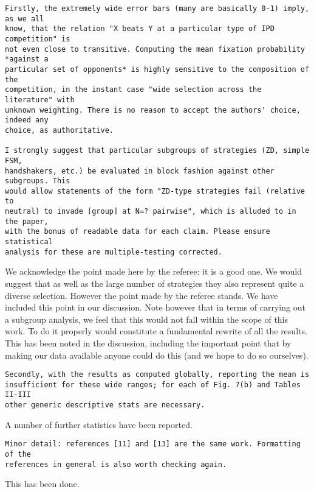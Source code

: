 \documentclass[a4]{article}
\begin{document}
\begin{verbatim}
Firstly, the extremely wide error bars (many are basically 0-1) imply, as we all
know, that the relation "X beats Y at a particular type of IPD competition" is
not even close to transitive. Computing the mean fixation probability *against a
particular set of opponents* is highly sensitive to the composition of the
competition, in the instant case "wide selection across the literature" with
unknown weighting. There is no reason to accept the authors' choice, indeed any
choice, as authoritative.

I strongly suggest that particular subgroups of strategies (ZD, simple FSM,
handshakers, etc.) be evaluated in block fashion against other subgroups. This
would allow statements of the form "ZD-type strategies fail (relative to
neutral) to invade [group] at N=? pairwise", which is alluded to in the paper,
with the bonus of readable data for each claim. Please ensure statistical
analysis for these are multiple-testing corrected.
\end{verbatim}

We acknowledge the point made here by the referee: it is a good one. We would
suggest that as well as the large number of strategies they also represent quite
a diverse selection. However the point made by the referee stands. We have
included this point in our discussion. Note however that in terms of carrying
out a subgroup analysis, we feel that this would not fall within the scope of
this work. To do it properly would constitute a fundamental rewrite of all the
results. This has been noted in the discussion, including the important point
that by making our data available anyone could do this (and we hope to do so
ourselves).

\begin{verbatim}
Secondly, with the results as computed globally, reporting the mean is
insufficient for these wide ranges; for each of Fig. 7(b) and Tables II-III
other generic descriptive stats are necessary.
\end{verbatim}

A number of further statistics have been reported.

\begin{verbatim}
Minor detail: references [11] and [13] are the same work. Formatting of the
references in general is also worth checking again.
\end{verbatim}

This has been done.
\end{document}
